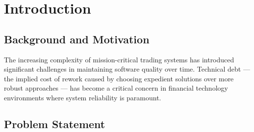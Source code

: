 \documentclass[
  british,
  12pt,
  a4paper,
]{report}
\let\cleardoublepage\clearpage
\begin{document}
\cleardoublepage


\begingroup

\tableofcontents %

\listoffigures %

\listoftables %

\endgroup

\cleardoublepage


\setcounter{page}{1}
\pagestyle{plain}
\linespread{1.5}\selectfont


\chapter*{}\label{section}

\markboth{}{}


\chapter{Introduction}\label{introduction}

\section{Background and Motivation}\label{background-and-motivation}

The increasing complexity of mission-critical trading systems has
introduced significant challenges in maintaining software quality over
time. Technical debt --- the implied cost of rework caused by choosing
expedient solutions over more robust approaches --- has become a
critical concern in financial technology environments where system
reliability is paramount.

\section{Problem Statement}\label{problem-statement}
\end{document}

